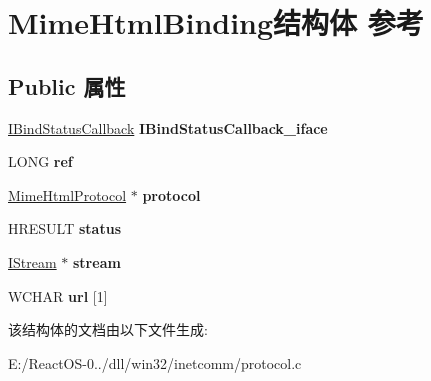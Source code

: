 \hypertarget{struct_mime_html_binding}{}\section{Mime\+Html\+Binding结构体 参考}
\label{struct_mime_html_binding}
\subsection*{Public 属性}
\begin{DoxyCompactItemize}
\item 
\mbox{\label{struct_mime_html_binding_a3001d890d3a7edf498775e13d045399a}} 
\hyperlink{interface_i_bind_status_callback}{I\+Bind\+Status\+Callback} {\bfseries I\+Bind\+Status\+Callback\+\_\+iface}
\item 
\mbox{\label{struct_mime_html_binding_a31e5de3c1e7ae6da97f490c824a8c44d}} 
L\+O\+NG {\bfseries ref}
\item 
\mbox{\label{struct_mime_html_binding_a9326be375fe6b30901f86fd216bb8b26}} 
\hyperlink{struct_mime_html_protocol}{Mime\+Html\+Protocol} $\ast$ {\bfseries protocol}
\item 
\mbox{\label{struct_mime_html_binding_a29c2ad7333a0f5a58e7b7dab862a1ad7}} 
H\+R\+E\+S\+U\+LT {\bfseries status}
\item 
\mbox{\label{struct_mime_html_binding_ab33896caa5226a94ac3178599c196b8d}} 
\hyperlink{interface_i_stream}{I\+Stream} $\ast$ {\bfseries stream}
\item 
\mbox{\label{struct_mime_html_binding_a42ad4842ca3c202cdec4865a1391f670}} 
W\+C\+H\+AR {\bfseries url} \mbox{[}1\mbox{]}
\end{DoxyCompactItemize}


该结构体的文档由以下文件生成\+:\begin{DoxyCompactItemize}
\item 
E\+:/\+React\+O\+S-\/0../dll/win32/inetcomm/protocol.\+c\end{DoxyCompactItemize}
